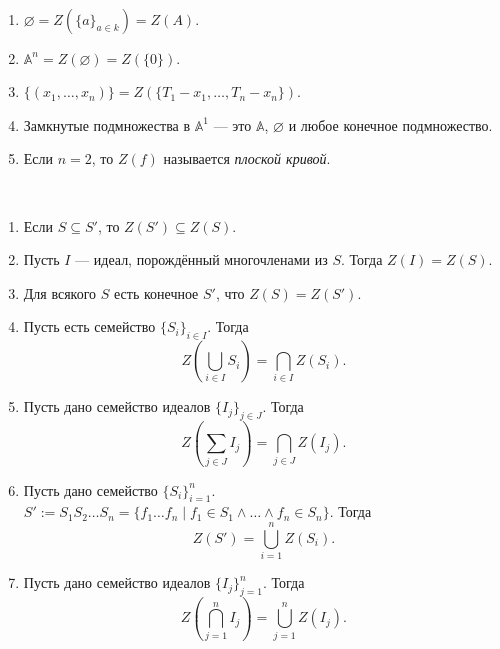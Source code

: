 \documentclass[12pt,a4paper]{article}
\renewcommand{\AA}{\ensuremath{\mathbb{A}}\xspace}
\begin{document}
    \begin{example}\ 
        \begin{enumerate}
            \item $\varnothing = Z(\{a\}_{a \in k}) = Z(A)$.
            \item $\AA^n = Z(\varnothing) = Z(\{0\})$.
            \item $\{(x_1, \dots, x_n)\} = Z(\{T_1 - x_1, \dots, T_n - x_n\})$.
            \item Замкнутые подмножества в $\AA^1$ --- это $\AA$, $\varnothing$ и любое конечное подмножество.
            \item Если $n = 2$, то $Z(f)$ называется \emph{плоской кривой}.
        \end{enumerate}
    \end{example}

    \begin{lemma}\ 
        \begin{enumerate}
            \item Если $S \subseteq S'$, то $Z(S') \subseteq Z(S)$.
            \item Пусть $I$ --- идеал, порождённый многочленами из $S$. Тогда $Z(I) = Z(S)$.
            \item Для всякого $S$ есть конечное $S'$, что $Z(S) = Z(S')$.
            \item Пусть есть семейство $\{S_i\}_{i \in I}$. Тогда
                \[Z\left(\bigcup_{i \in I} S_i\right) = \bigcap_{i \in I} Z(S_i).\]
            \item Пусть дано семейство идеалов $\{I_j\}_{j \in J}$. Тогда
                \[Z\left(\sum_{j \in J} I_j\right) = \bigcap_{j \in J} Z(I_j).\]
            \item Пусть дано семейство $\{S_i\}_{i=1}^n$. $S' := S_1 S_2 \dots S_n = \{f_1 \dots f_n \mid f_1 \in S_1 \wedge \dots \wedge f_n \in S_n\}$. Тогда
                \[Z(S') = \bigcup_{i = 1}^n Z(S_i).\]
            \item Пусть дано семейство идеалов $\{I_j\}_{j=1}^n$. Тогда
                \[Z\left(\bigcap_{j=1}^n I_j\right) = \bigcup_{j=1}^n Z(I_j).\]
        \end{enumerate}
    \end{lemma}
\end{document}
